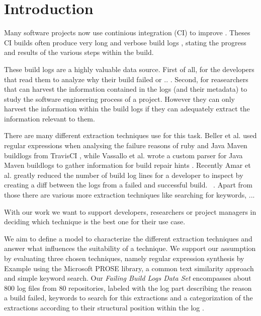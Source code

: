 \documentclass[\myrootdir/main.tex]{subfiles}
\begin{document}
\chapter{Introduction}
Many software projects now use continious integration (CI) to improve . Theses CI builds often produce very long and verbose build logs , stating the progress and results of the various steps within the build.

These build logs are a highly valuable data source. First of all, for the developers that read them to analyze why their build failed or .. . Second, for reasearchers that can harvest the information contained in the logs (and their metadata) to study the software engineering process of a project. However they can only harvest the information within the build logs if they can adequately extract the information relevant to them.

There are many different extraction techniques use for this task. Beller et al.  used regular expressions when analysing the failure reasons of ruby and Java Maven buildlogs from TravisCI \cite{beller2017oops}, while Vassallo et al. wrote a custom parser for Java Maven buildlogs to gather information for build repair hints \cite{vassallo2018un-break}. Recently Amar et al. greatly reduced the number of build log lines for a developer to inspect by creating a diff between the logs from a failed and successful build.~\cite{amar2019mining} . Apart from those there are various more extraction techniques like searching for keywords, ...  

With our work we want to support developers, researchers or project managers in deciding which technique is the best one for their use case. 


We aim to define a model to characterize the different extraction techniques and answer what influences the suitability of a technique. We support our assumption by evaluating three chosen techniques, namely regular expression synthesis by Example using the Microsoft PROSE library, a common text similarity approach and simple keyword search. Our \emph{Failing Build Logs Data Set} encompasses about 800 log files from 80 repositories, labeled with the log part describing the reason a build failed, keywords to search for this extractions and a categorization of the extractions according to their structural position within the log . 
\end{document}
